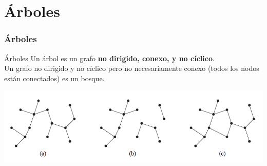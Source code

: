 \documentclass{beamer}
\begin{document}
% 
% 
% 
% 
% 
% 
% 			
% 

\section{Árboles}

	\begin{frame}
		\frametitle{Árboles}
		\begin{block}{Árboles}
			Un árbol es un grafo \textbf{no dirigido, conexo, y no cíclico}.\\
			Un grafo no dirigido y no cíclico pero no necesariamente conexo (todos los nodos están conectados) es un bosque.
		\end{block}
		\includegraphics[width = 1\textwidth]{Tree.png}
	\end{frame}
	
\end{document}
